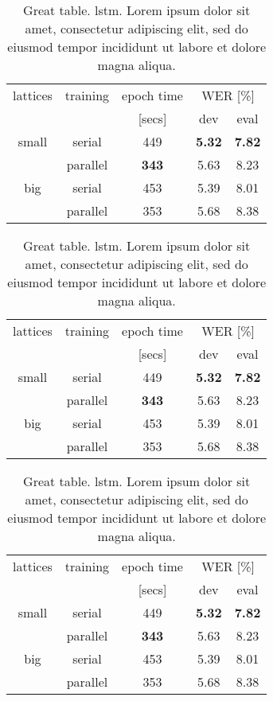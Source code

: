 \begin{table}
\centering
\caption{Great table. \Gls{lstm}.
Lorem ipsum dolor sit amet, consectetur adipiscing elit,
sed do eiusmod tempor incididunt ut labore et dolore magna aliqua.}
\label{tab:chap5:sth5}
\begin{tabular}{|c|c|c|c|c|}
\hline
lattices & training & epoch time & \multicolumn{2}{c|}{WER [\%]} \\
{}       & {}       & [secs]  & dev & eval \\ \hline \hline
small    & serial & 449  & \textbf{5.32} & \textbf{7.82} \\ \cline{2-5}
{}       & parallel & \textbf{343}  & 5.63 & 8.23 \\ \hline \hline
big      & serial   &   453        & 5.39 & 8.01 \\ \cline{2-5}
{}       & parallel &   353        & 5.68 & 8.38 \\ \hline
\end{tabular}
\end{table}


\begin{table}
\centering
\caption{Great table. \Gls{lstm}.
Lorem ipsum dolor sit amet, consectetur adipiscing elit,
sed do eiusmod tempor incididunt ut labore et dolore magna aliqua.}
\label{tab:chap5:sth6}
\begin{tabular}{|c|c|c|c|c|}
\hline
lattices & training & epoch time & \multicolumn{2}{c|}{WER [\%]} \\
{}       & {}       & [secs]  & dev & eval \\ \hline \hline
small    & serial & 449  & \textbf{5.32} & \textbf{7.82} \\ \cline{2-5}
{}       & parallel & \textbf{343}  & 5.63 & 8.23 \\ \hline \hline
big      & serial   &   453        & 5.39 & 8.01 \\ \cline{2-5}
{}       & parallel &   353        & 5.68 & 8.38 \\ \hline
\end{tabular}
\end{table}


\begin{table}
\centering
\caption{Great table. \Gls{lstm}.
Lorem ipsum dolor sit amet, consectetur adipiscing elit,
sed do eiusmod tempor incididunt ut labore et dolore magna aliqua.}
\label{tab:chap5:sth7}
\begin{tabular}{|c|c|c|c|c|}
\hline
lattices & training & epoch time & \multicolumn{2}{c|}{WER [\%]} \\
{}       & {}       & [secs]  & dev & eval \\ \hline \hline
small    & serial & 449  & \textbf{5.32} & \textbf{7.82} \\ \cline{2-5}
{}       & parallel & \textbf{343}  & 5.63 & 8.23 \\ \hline \hline
big      & serial   &   453        & 5.39 & 8.01 \\ \cline{2-5}
{}       & parallel &   353        & 5.68 & 8.38 \\ \hline
\end{tabular}
\end{table}


